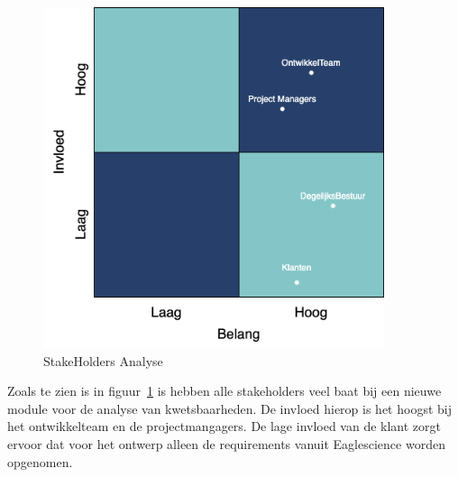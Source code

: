 \begin{figure}
    \myfloatalign
    \includegraphics[width=10cm]{gfx/stakeholderanalyse}
    \caption{StakeHolders Analyse}
    \label{fig:StakeholderAnalyse1}
\end{figure}
Zoals te zien is in figuur~\ref{fig:StakeholderAnalyse1} is hebben alle stakeholders veel baat bij een nieuwe module voor de analyse van kwetsbaarheden. De invloed hierop is het hoogst bij het ontwikkelteam en de projectmangagers. De lage invloed van de klant zorgt ervoor dat voor het ontwerp alleen de requirements vanuit Eaglescience worden opgenomen.


